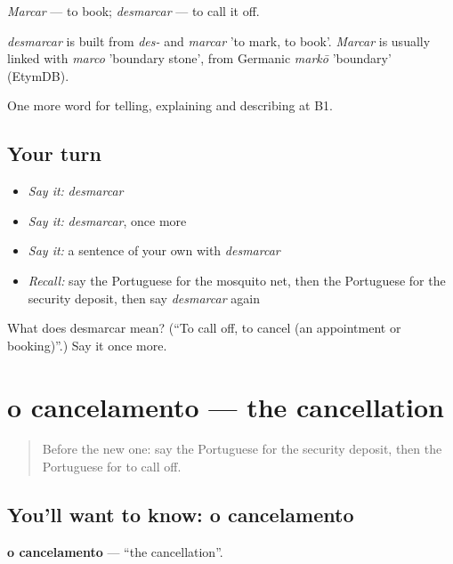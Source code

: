 \emph{Marcar} — to book; \emph{desmarcar} — to call it off.

\begin{cousinweb}
\emph{desmarcar} is built from \emph{des-} and \emph{marcar} 'to mark, to book'. \emph{Marcar} is usually linked with \emph{marco} 'boundary stone', from Germanic \emph{markō} 'boundary' (EtymDB).
\end{cousinweb}

\begin{grammarlens}[title={What you've built}]
One more word for telling, explaining and describing at B1.
\end{grammarlens}

\subsection*{Your turn}
\begin{itemize}
\raggedright
  \item \emph{Say it:} \emph{desmarcar}
  \item \emph{Say it:} \emph{desmarcar}, once more
  \item \emph{Say it:} a sentence of your own with \emph{desmarcar}
  \item \emph{Recall:} say the Portuguese for the mosquito net, then the Portuguese for the security deposit, then say \emph{desmarcar} again
\end{itemize}

\begin{tcolorbox}[breakable,colback=teal!4,colframe=teal!35!black,title={Before you move on}]
What does desmarcar mean? (\textquotedblleft{}To call off, to cancel (an appointment or booking)\textquotedblright{}.) Say it once more.
\end{tcolorbox}
\section[o cancelamento]{o cancelamento — the cancellation}

\label{lesson:PT-C427-cancelamento}



\begin{quote}
Before the new one: say the Portuguese for the security deposit, then the Portuguese for to call off.
\end{quote}

\subsection*{You'll want to know: o cancelamento}
\textbf{o cancelamento} — \textquotedblleft{}the cancellation\textquotedblright{}.

